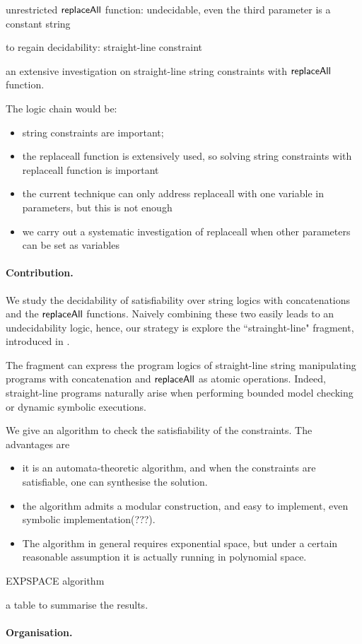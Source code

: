 unrestricted $\mathsf{replaceAll}$ function: undecidable, even the third parameter is a constant string

to regain decidability: straight-line constraint

an extensive investigation on straight-line string constraints with $\mathsf{replaceAll}$ function. 


The logic chain would be:
\begin{itemize}
	\item string constraints are important;
	\item the replaceall function is extensively used, so solving string constraints with replaceall function is important
	\item the current technique \cite{LB16} can only address replaceall with one variable in parameters, but this is not enough
	\item we carry out a systematic investigation of replaceall when other parameters can be set as variables 
\end{itemize}

\paragraph{Contribution.} We study the decidability of satisfiability over string logics with concatenations and the $\mathsf{replaceAll}$ functions. Naively combining these two easily leads to an undecidability logic, hence, our strategy is explore the ``strainght-line" fragment, introduced in \cite{LB16}. 

The fragment can express the program logics of straight-line string manipulating programs with concatenation and $\mathsf{replaceAll}$ as atomic operations. Indeed, straight-line programs naturally arise when performing bounded model checking or dynamic symbolic executions. 

We give an algorithm to check the satisfiability of the constraints. The advantages are 
\begin{itemize}
	\item it is an automata-theoretic algorithm, and when the constraints are satisfiable, one can synthesise the solution. 
	
	\item the algorithm admits a modular construction, and easy to implement, even symbolic implementation(???). 
	
	
	\item The algorithm in general requires exponential space, but under a certain reasonable assumption it is actually running in polynomial space. 
\end{itemize}



EXPSPACE algorithm

a table to summarise the results.


\paragraph{Organisation.} 


